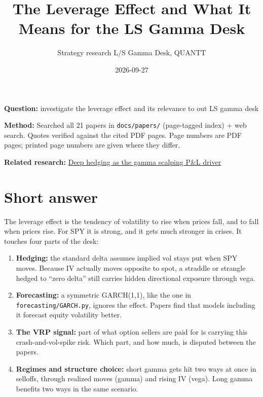\documentclass{article}
\title{The Leverage Effect and What It Means for the LS Gamma Desk}
\author{Strategy research \textperiodcentered{} L/S Gamma Desk, QUANTT}
\date{2026-09-27}
\begin{document}
\maketitle

\textbf{Question:} investigate the leverage effect and its relevance to out LS gamma desk

\textbf{Method:} Searched all 21 papers in \texttt{docs/\allowbreak{}papers/\allowbreak{}} (page-tagged index) + web search. Quotes verified against the cited PDF pages. Page numbers are PDF pages; printed page numbers are given where they differ.

\textbf{Related research:} \href{2026-09-27-deep-hedging-as-gamma-scalping-pnl-driver.pdf}{Deep hedging as the gamma scalping P\&L driver}

\section{Short answer}

The leverage effect is the tendency of volatility to rise when prices fall, and to fall when prices rise. For SPY it is strong, and it gets much stronger in crises. It touches four parts of the desk:

\begin{enumerate}

\item \textbf{Hedging:} the standard delta assumes implied vol stays put when SPY moves. Because IV actually moves opposite to spot, a straddle or strangle hedged to ``zero delta'' still carries hidden directional exposure through vega.

\item \textbf{Forecasting:} a symmetric GARCH(1,1), like the one in \texttt{forecasting/\allowbreak{}GARCH.\allowbreak{}py}, ignores the effect. Papers find that models including it forecast equity volatility better.

\item \textbf{The VRP signal:} part of what option sellers are paid for is carrying this crash-and-vol-spike risk. Which part, and how much, is disputed between the papers.

\item \textbf{Regimes and structure choice:} short gamma gets hit two ways at once in selloffs, through realized moves (gamma) and rising IV (vega). Long gamma benefits two ways in the same scenario.

\end{enumerate}
\end{document}
